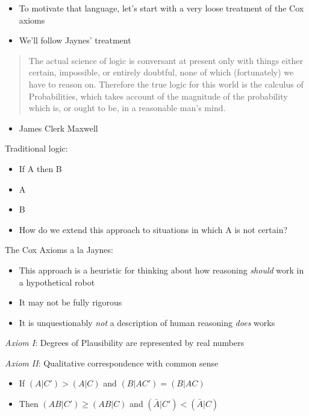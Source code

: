 \documentclass{beamer}
\begin{document}

\frame
{
  \begin{itemize}
    \item{To motivate that language, let's start with a very loose treatment of the Cox axioms}
    \item{We'll follow Jaynes' treatment}
  \end{itemize}
}

\frame
{
  \begin{quote}
The actual science of logic is conversant at present only with things either certain, impossible, or entirely doubtful, none of which (fortunately) we have to reason on. Therefore the true logic for this world is the calculus of Probabilities, which takes account of the magnitude of the probability which is, or ought to be, in a reasonable man's mind.
  \end{quote}
  \begin{itemize}
    \item{James Clerk Maxwell}
  \end{itemize}
}

\frame
{
 Traditional logic:
 \begin{itemize}
   \item{If A then B}
   \item{A}
   \item{B}
 \end{itemize}
}

\frame
{
  \begin{itemize}
    \item{How do we extend this approach to situations in which A is not certain?}
  \end{itemize}
}

\frame
{
  The Cox Axioms a la Jaynes:
  \begin{itemize}
    \item{This approach is a heuristic for thinking about how reasoning \emph{should} work in a hypothetical robot}
    \item{It may not be fully rigorous}
    \item{It is unquestionably \emph{not} a description of human reasoning \emph{does} works}
  \end{itemize}
}

\frame
{
  \emph{Axiom I}: Degrees of Plausibility are represented by real numbers
}

\frame
{
  \emph{Axiom II}: Qualitative correspondence with common sense
  \begin{itemize}
    \item{If $(A | C') > (A | C)$ and $(B | AC') = (B | AC)$}
    \item{Then $(AB | C') \geq (AB | C)$ and $(\bar{A} | C') < (\bar{A} | C)$}
  \end{itemize}
}
\end{document}
